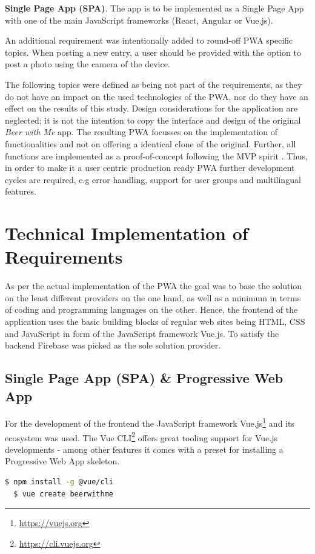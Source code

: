 \textbf{Single Page App (SPA)}. The app is to be implemented as a Single Page App with one of the main JavaScript frameworks (React, Angular or Vue.js).

An additional requirement was intentionally added to round-off PWA specific topics. When posting a new entry, a user should be provided with the option to post a photo using the camera of the device.

The following topics were defined as being not part of the requirements, as they do not have an impact on the used technologies of the PWA, nor do they have an effect on the results of this study. Design considerations for the application are neglected; it is not the intention to copy the interface and design of the original \textit{Beer with Me} app. The resulting PWA focusses on the implementation of functionalities and not on offering a identical clone of the original. Further, all functions are implemented as a proof-of-concept following the MVP spirit \citep{wikipediaMinimumViableProduct2019}. Thus, in order to make it a user centric production ready PWA further development cycles are required, e.g error handling, support for user groups and multilingual features.


\section{Technical Implementation of Requirements}
As per the actual implementation of the PWA the goal was to base the solution on the least different providers on the one hand, as well as a minimum in terms of coding and programming languages on the other. Hence, the frontend of the application uses the basic building blocks of regular web sites being HTML, CSS and JavaScript in form of the JavaScript framework Vue.js. To satisfy the backend Firebase was picked as the sole solution provider.

\subsection{Single Page App (SPA) \& Progressive Web App}
For the development of the frontend the JavaScript framework Vue.js\footnote{\url{https://vuejs.org}} and its ecosystem was used. The Vue CLI\footnote{\url{https://cli.vuejs.org}} offers great tooling support for Vue.js developments - among other features it comes with a preset for installing a Progressive Web App skeleton.

\begin{lstlisting}[language=bash, caption=Installation and project creation commands with the Vue Cli, label=lst:vue-cli]
  $ npm install -g @vue/cli
  $ vue create beerwithme
\end{lstlisting}

